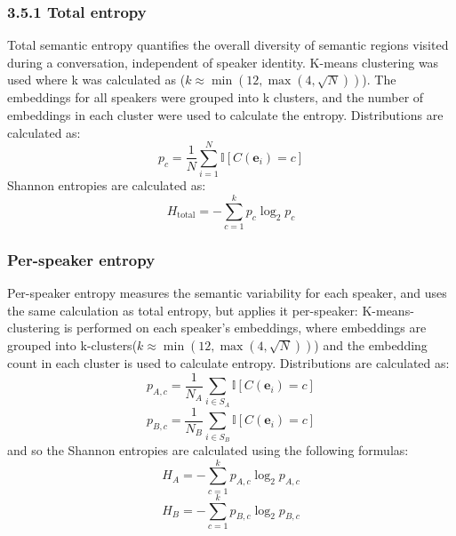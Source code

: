 \documentclass{article}
\theoremstyle{definition}
\numberwithin{table}{section}
\begin{document}
\subsubsection{3.5.1 Total entropy}
Total semantic entropy quantifies the overall diversity of semantic regions visited during a conversation, independent of speaker identity. K-means clustering was used where k was calculated as (\begin{math}k \approx \min\left(12,\max\left(4,\sqrt{N}\right)\right)
\end{math}). The embeddings for all speakers were grouped into k clusters, and the number of embeddings in each cluster were used to calculate the entropy. 
Distributions are calculated as: 
\begin{equation}
    p_c = \frac{1}{N} \sum_{i=1}^{N} \mathbb{I}[C(\mathbf{e}_i) = c]
\end{equation}
Shannon entropies are calculated as: 
\begin{equation}
    H_{\text{total}}=-\sum_{c=1}^{k} p_c \log_2 p_c
\end{equation}

\subsubsection{Per-speaker entropy}

Per-speaker entropy measures the semantic variability for each speaker, and uses the same calculation as total entropy, but applies it per-speaker: 
K-means-clustering is performed on each speaker's embeddings, where embeddings are grouped into k-clusters(\begin{math}k \approx \min\left(12,\max\left(4,\sqrt{N}\right)\right)
\end{math}) and the embedding count in each cluster is used to calculate entropy. 
Distributions are calculated as:
\begin{equation}
p_{A,c}
=
\frac{1}{N_A}
\sum_{i \in S_A}
\mathbb{I}[C(\mathbf{e}_i) = c]
\end{equation}
\begin{equation}
p_{B,c}
=
\frac{1}{N_B}
\sum_{i \in S_B}
\mathbb{I}[C(\mathbf{e}_i) = c]
\end{equation}
and so the Shannon entropies are calculated using the following formulas: 
\begin{equation}
    H_A=-\sum_{c=1}^{k} p_{A,c} \log_2 p_{A,c}
\end{equation}
\begin{equation}
    H_B=-\sum_{c=1}^{k} p_{B,c} \log_2 p_{B,c}
\end{equation}
\end{document}
